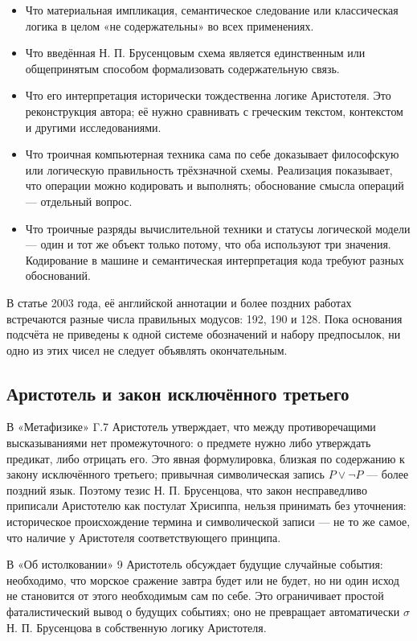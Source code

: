 \documentclass[12pt,a4paper]{article}
\begin{document}
\begin{itemize}
\item Что материальная импликация, семантическое следование или классическая логика в целом «не содержательны» во всех применениях.
\item Что введённая Н. П. Брусенцовым схема является единственным или общепринятым способом формализовать содержательную связь.
\item Что его интерпретация исторически тождественна логике Аристотеля. Это реконструкция автора; её нужно сравнивать с греческим текстом, контекстом и другими исследованиями.
\item Что троичная компьютерная техника сама по себе доказывает философскую или логическую правильность трёхзначной схемы. Реализация показывает, что операции можно кодировать и выполнять; обоснование смысла операций — отдельный вопрос.
\item Что троичные разряды вычислительной техники и статусы логической модели — один и тот же объект только потому, что оба используют три значения. Кодирование в машине и семантическая интерпретация кода требуют разных обоснований.
\end{itemize}
В статье 2003 года, её английской аннотации и более поздних работах встречаются разные числа правильных модусов: 192, 190 и 128. Пока основания подсчёта не приведены к одной системе обозначений и набору предпосылок, ни одно из этих чисел не следует объявлять окончательным.

\subsection{Аристотель и закон исключённого третьего}

В «Метафизике» Γ.7 Аристотель утверждает, что между противоречащими высказываниями нет промежуточного: о предмете нужно либо утверждать предикат, либо отрицать его. Это явная формулировка, близкая по содержанию к закону исключённого третьего; привычная символическая запись \(P\lor\neg P\) — более поздний язык. Поэтому тезис Н. П. Брусенцова, что закон несправедливо приписали Аристотелю как постулат Хрисиппа, нельзя принимать без уточнения: историческое происхождение термина и символической записи — не то же самое, что наличие у Аристотеля соответствующего принципа.

В «Об истолковании» 9 Аристотель обсуждает будущие случайные события: необходимо, что морское сражение завтра будет или не будет, но ни один исход не становится от этого необходимым сам по себе. Это ограничивает простой фаталистический вывод о будущих событиях; оно не превращает автоматически \(\sigma\) Н. П. Брусенцова в собственную логику Аристотеля.
\end{document}
